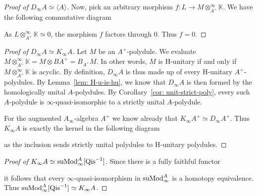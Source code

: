 \documentclass[../thesis.tex]{subfiles}
\begin{document}
\begin{proof}[Proof of $D_\infty A \simeq \langle A \rangle$]
                Now, pick an arbitrary morphism $f : L \rightarrow M \otimes_{A^+}^\infty \mathbb{K}$. We have the following commutative diagram
                \begin{center}
                \end{center}

                As $L \otimes_{A^+}^\infty \mathbb{K} \simeq 0$, the morphism $f$ factors through $0$. Thus $f = 0$.
            \end{proof}

            \begin{proof}[Proof of $D_\infty A \simeq K_\infty A$]
                Let $M$ be an $A^+$-polydule. We evaluate $M \otimes_{A^+}^\infty \mathbb{K} = M \otimes BA^+ = B_{A^+}M$. In other words, $M$ is H-unitary if and only if $M \otimes_{A^+}^\infty \mathbb{K}$ is acyclic. By definition, $D_\infty A$ is thus made up of every H-unitary $A^+$-polydules. By Lemma~\ref{lem: H-u-is-hu}, we know that $D_\infty A$ is then formed by the homologically unital $A$-polydules. By Corollary~\ref{cor: unit-strict-poly}, every such $A$-polydule is $\infty$-quasi-isomorphic to a strictly unital $A$-polydule.

                For the augmented $A_\infty$-algebra $A^+$ we know already that $K_\infty A^+ \simeq D_\infty A^+$. Thus $K_\infty A$ is exactly the kernel in the following diagram
                \begin{center}
                \end{center}
                as the inclusion sends strictly unital polydules to H-unitary polydules.
            \end{proof}

            \begin{proof}[Proof of $K_\infty A \simeq \tt{suMod}_\infty^A{[\tt{Qis}^{-1}]}$]
                Since there is a fully faithful functor
                \begin{center}
                \end{center}
                it follows that every $\infty$-quasi-isomorphism in $\tt{suMod}_\infty^A$ is a homotopy equivalence. Thus $\tt{suMod}_\infty^A[\tt{Qis}^{-1}]\simeq K_\infty A$.
            \end{proof}
\end{document}
